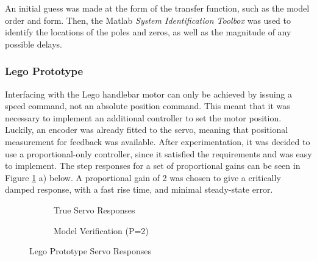 An initial guess was made at the form of the transfer function, such as the model order and form. Then, the Matlab \textit{System Identification Toolbox} was used to identify the locations of the poles and zeros, as well as the magnitude of any possible delays.

\subsubsection{Lego Prototype}
Interfacing with the Lego handlebar motor can only be achieved by issuing a speed command, not an absolute position command. This meant that it was necessary to implement an additional controller to set the motor position. Luckily, an encoder was already fitted to the servo, meaning that positional measurement for feedback was available. After experimentation, it was decided to use a proportional-only controller, since it satisfied the requirements and was easy to implement. The step responses for a set of proportional gains can be seen in Figure \ref{fig:ServoModel} a) below. A proportional gain of 2 was chosen to give a critically damped response, with a fast rise time, and minimal steady-state error. \\

\begin{figure}[H]
	\begin{subfigure}[t]{0.5\textwidth}
	\caption{True Servo Responses}
	\end{subfigure}
	\begin{subfigure}[t]{0.5\textwidth}
	\caption{Model Verification (P=2)}
	\end{subfigure}
	\caption{Lego Prototype Servo Responses}
	\label{fig:ServoModel}
\end{figure}

